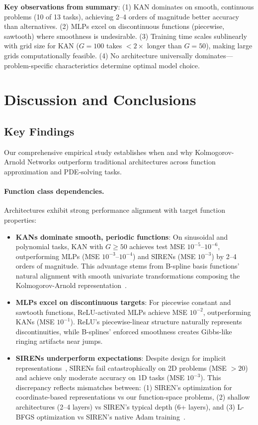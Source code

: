 \documentclass[11pt,a4paper]{article}
\begin{document}
\textbf{Key observations from summary}: (1) KAN dominates on smooth, continuous problems (10 of 13 tasks), achieving 2--4 orders of magnitude better accuracy than alternatives. (2) MLPs excel on discontinuous functions (piecewise, sawtooth) where smoothness is undesirable. (3) Training time scales sublinearly with grid size for KAN ($G=100$ takes $<2\times$ longer than $G=50$), making large grids computationally feasible. (4) No architecture universally dominates—problem-specific characteristics determine optimal model choice.

\section{Discussion and Conclusions}
\label{sec:discussion}

\subsection{Key Findings}

Our comprehensive empirical study establishes when and why Kolmogorov-Arnold Networks outperform traditional architectures across function approximation and PDE-solving tasks.

\paragraph{Function class dependencies.} Architectures exhibit strong performance alignment with target function properties:
\begin{itemize}
    \item \textbf{KANs dominate smooth, periodic functions}: On sinusoidal and polynomial tasks, KAN with $G \geq 50$ achieves test MSE $10^{-5}$--$10^{-6}$, outperforming MLPs (MSE $10^{-3}$--$10^{-4}$) and SIRENs (MSE $10^{-3}$) by 2--4 orders of magnitude. This advantage stems from B-spline basis functions' natural alignment with smooth univariate transformations composing the Kolmogorov-Arnold representation~\citep{liu2024kan}.
    \item \textbf{MLPs excel on discontinuous targets}: For piecewise constant and sawtooth functions, ReLU-activated MLPs achieve MSE $10^{-2}$, outperforming KANs (MSE $10^{-1}$). ReLU's piecewise-linear structure naturally represents discontinuities, while B-splines' enforced smoothness creates Gibbs-like ringing artifacts near jumps.
    \item \textbf{SIRENs underperform expectations}: Despite design for implicit representations~\citep{sitzmann2020implicit}, SIRENs fail catastrophically on 2D problems (MSE $>20$) and achieve only moderate accuracy on 1D tasks (MSE $10^{-3}$). This discrepancy reflects mismatches between: (1) SIREN's optimization for coordinate-based representations vs our function-space problems, (2) shallow architectures (2--4 layers) vs SIREN's typical depth (6+ layers), and (3) L-BFGS optimization vs SIREN's native Adam training~\citep{sitzmann2020implicit, kingma2015adam}.
\end{itemize}
\end{document}
